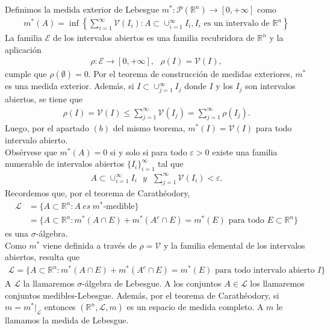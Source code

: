Definimos la medida exterior de Lebesgue $m^*: \mathcal{P}(\mathbb{R}^n) \longrightarrow [0,+\infty]$ como
\begin{align*}
    m^*(A) = \inf \left\{ \sum_{i=1}^{\infty}{\mathcal{V}(I_i)} : A \subset \cup_{i=1}^{\infty}{I_i}, I_i \text{ es un intervalo de } \mathbb{R}^n\right\}
\end{align*}
La familia $\mathcal{E}$ de los intervalos abiertos es una familia recubridora de $\mathbb{R}^n$ y la aplicación 
\begin{align*}
    \rho : \mathcal{E} \longrightarrow [0,+\infty], \ \ \ \rho(I) = \mathcal{V}(I),
\end{align*}
cumple que $\rho(\emptyset) = 0$. Por el teorema de construcción de medidas exteriores, $m^*$ es una medida exterior. Además, si $I \subset \cup_{j=1}^{\infty}{I_j}$ donde $I$ y los $I_j$ son intervalos abiertos, se tiene que
\begin{align*}
    \rho(I) = \mathcal{V}(I) \leq \sum_{j=1}^{\infty}{\mathcal{V}(I_j)} = \sum_{j=1}^{\infty}{\rho(I_j)}.
\end{align*}
Luego, por el apartado $(b)$ del mismo teorema, $m^*(I) = \mathcal{V}(I)$ para todo intervalo abierto.
\\
\newline
Obsérvese que $m^*(A) = 0$ si y solo si para todo $\varepsilon > 0$ existe una familia numerable de intervalos abiertos $\{I_i\}_{i=1}^{\infty}$ tal que
\begin{align*}
    A \subset \cup_{i=1}^{\infty}{I_i} \ \ \ y \ \ \ \sum_{j=1}^{\infty}{\mathcal{V}(I_i)} < \varepsilon.
\end{align*}
Recordemos que, por el teorema de Carathéodory, 
\begin{align*}
    \mathcal{L} &= \{A \subset \mathbb{R}^n : A \ es \ m^* \text{-medible} \}\\
    &= \{A \subset \mathbb{R}^n : m^*(A \cap E) + m^*(A^c \cap E) = m^*(E) \text{ para todo } E \subset \mathbb{R}^n \}
\end{align*}
es una $\sigma$-álgebra.
\\
\newline
Como $m^*$ viene definida a través de $\rho = \mathcal{V}$ y la familia elemental de los intervalos abiertos, resulta que
\begin{align*}
    \mathcal{L} = \{A \subset \mathbb{R}^n : m^*(A \cap E) + m^*(A^c \cap E) = m^*(E) \text{ para todo intervalo abierto } I\}
\end{align*}
A $\mathcal{L}$ la llamaremos $\sigma$-álgebra de Lebesgue. A los conjuntos $A \in \mathcal{L}$ los llamaremos conjuntos medibles-Lebesgue. Además, por el teorema de Carathéodory, si $m = m^*|_{\mathcal{L}}$ entonces $(\mathbb{R}^n, \mathcal{L}, m)$ es un espacio de medida completo. A $m$ le llamamos la medida de Lebesgue.

